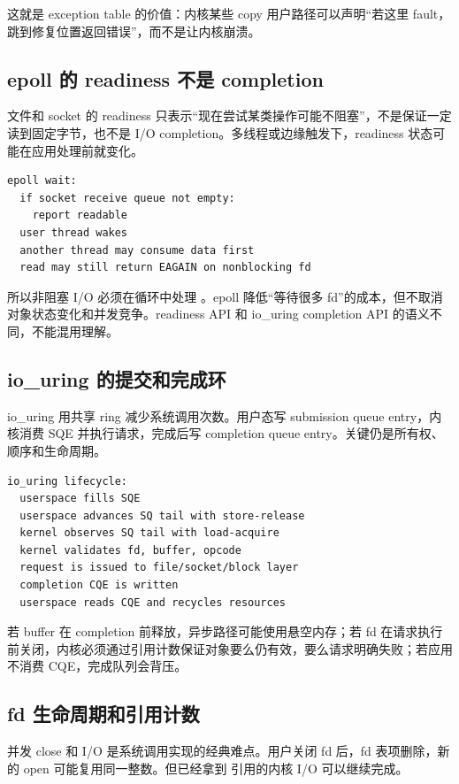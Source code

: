 这就是 exception table 的价值：内核某些 copy 用户路径可以声明“若这里 fault，跳到修复位置返回错误”，而不是让内核崩溃。

\subsection{epoll 的 readiness 不是 completion}

文件和 socket 的 readiness 只表示“现在尝试某类操作可能不阻塞”，不是保证一定读到固定字节，也不是 I/O completion。多线程或边缘触发下，readiness 状态可能在应用处理前就变化。

\begin{lstlisting}
epoll wait:
  if socket receive queue not empty:
    report readable
  user thread wakes
  another thread may consume data first
  read may still return EAGAIN on nonblocking fd
\end{lstlisting}

所以非阻塞 I/O 必须在循环中处理 。epoll 降低“等待很多 fd”的成本，但不取消对象状态变化和并发竞争。readiness API 和 io\_uring completion API 的语义不同，不能混用理解。

\subsection{io\_uring 的提交和完成环}

io\_uring 用共享 ring 减少系统调用次数。用户态写 submission queue entry，内核消费 SQE 并执行请求，完成后写 completion queue entry。关键仍是所有权、顺序和生命周期。

\begin{lstlisting}
io_uring lifecycle:
  userspace fills SQE
  userspace advances SQ tail with store-release
  kernel observes SQ tail with load-acquire
  kernel validates fd, buffer, opcode
  request is issued to file/socket/block layer
  completion CQE is written
  userspace reads CQE and recycles resources
\end{lstlisting}

若 buffer 在 completion 前释放，异步路径可能使用悬空内存；若 fd 在请求执行前关闭，内核必须通过引用计数保证对象要么仍有效，要么请求明确失败；若应用不消费 CQE，完成队列会背压。

\subsection{fd 生命周期和引用计数}

并发 close 和 I/O 是系统调用实现的经典难点。用户关闭 fd 后，fd 表项删除，新的 open 可能复用同一整数。但已经拿到  引用的内核 I/O 可以继续完成。

